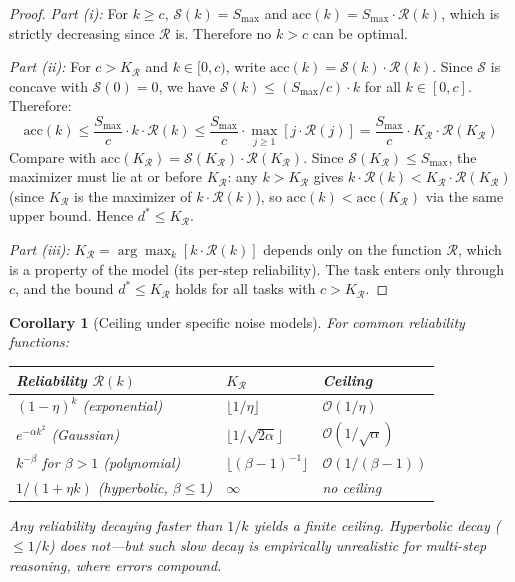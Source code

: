 \documentclass{article}
\newtheorem{corollary}[theorem]{Corollary}
\theoremstyle{definition}
\theoremstyle{remark}
\newcommand{\depth}{d^*}       %
\newcommand{\noise}{\eta}      %
\newcommand{\acc}{\mathrm{acc}} %
\newcommand{\suf}{\mathcal{S}} %
\newcommand{\rel}{\mathcal{R}} %
\newcommand{\Smax}{S_{\max}}   %
\newcommand{\bigO}{\mathcal{O}}
\begin{document}
\begin{proof}
\emph{Part (i):} For $k \geq c$, $\suf(k) = \Smax$ and $\acc(k) = \Smax \cdot \rel(k)$, which is strictly decreasing since $\rel$ is. Therefore no $k > c$ can be optimal.

\emph{Part (ii):} For $c > K_\rel$ and $k \in [0, c)$, write $\acc(k) = \suf(k) \cdot \rel(k)$. Since $\suf$ is concave with $\suf(0) = 0$, we have $\suf(k) \leq (\Smax/c) \cdot k$ for all $k \in [0, c]$. Therefore:
\[
\acc(k) \leq \frac{\Smax}{c} \cdot k \cdot \rel(k) \leq \frac{\Smax}{c} \cdot \max_{j \geq 1} [j \cdot \rel(j)] = \frac{\Smax}{c} \cdot K_\rel \cdot \rel(K_\rel)
\]
Compare with $\acc(K_\rel) = \suf(K_\rel) \cdot \rel(K_\rel)$. Since $\suf(K_\rel) \leq \Smax$, the maximizer must lie at or before $K_\rel$: any $k > K_\rel$ gives $k \cdot \rel(k) < K_\rel \cdot \rel(K_\rel)$ (since $K_\rel$ is the maximizer of $k \cdot \rel(k)$), so $\acc(k) < \acc(K_\rel)$ via the same upper bound. Hence $\depth \leq K_\rel$.

\emph{Part (iii):} $K_\rel = \arg\max_k [k \cdot \rel(k)]$ depends only on the function $\rel$, which is a property of the model (its per-step reliability). The task enters only through $c$, and the bound $\depth \leq K_\rel$ holds for all tasks with $c > K_\rel$.
\end{proof}

\begin{corollary}[Ceiling under specific noise models]
\label{cor:ceiling-models}
For common reliability functions:
\begin{center}
\begin{tabular}{lll}
\toprule
\textbf{Reliability $\rel(k)$} & \textbf{$K_\rel$} & \textbf{Ceiling} \\
\midrule
$(1-\noise)^k$ (exponential) & $\lfloor 1/\noise \rfloor$ & $\bigO(1/\noise)$ \\
$e^{-\alpha k^2}$ (Gaussian) & $\lfloor 1/\sqrt{2\alpha} \rfloor$ & $\bigO(1/\sqrt{\alpha})$ \\
$k^{-\beta}$ for $\beta > 1$ (polynomial) & $\lfloor (\beta - 1)^{-1} \rfloor$ & $\bigO(1/(\beta-1))$ \\
$1/(1 + \noise k)$ (hyperbolic, $\beta \leq 1$) & $\infty$ & no ceiling \\
\bottomrule
\end{tabular}
\end{center}
Any reliability decaying faster than $1/k$ yields a finite ceiling. Hyperbolic decay ($\leq 1/k$) does not---but such slow decay is empirically unrealistic for multi-step reasoning, where errors compound.
\end{corollary}
\end{document}
